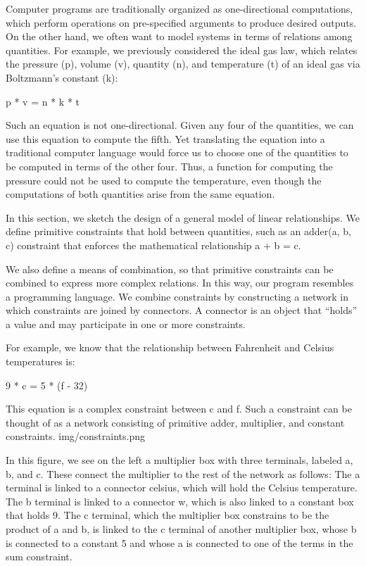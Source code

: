 \documentclass[letterpaper,10pt,dvipdfmx]{sphinxmanual}
\begin{document}
Computer programs are traditionally organized as one-directional computations, which perform operations on pre-specified arguments to produce desired outputs. On the other hand, we often want to model systems in terms of relations among quantities. For example, we previously considered the ideal gas law, which relates the pressure (p), volume (v), quantity (n), and temperature (t) of an ideal gas via Boltzmann's constant (k):

p * v = n * k * t

Such an equation is not one-directional. Given any four of the quantities, we can use this equation to compute the fifth. Yet translating the equation into a traditional computer language would force us to choose one of the quantities to be computed in terms of the other four. Thus, a function for computing the pressure could not be used to compute the temperature, even though the computations of both quantities arise from the same equation.

In this section, we sketch the design of a general model of linear relationships. We define primitive constraints that hold between quantities, such as an adder(a, b, c) constraint that enforces the mathematical relationship a + b = c.

We also define a means of combination, so that primitive constraints can be combined to express more complex relations. In this way, our program resembles a programming language. We combine constraints by constructing a network in which constraints are joined by connectors. A connector is an object that ``holds'' a value and may participate in one or more constraints.

For example, we know that the relationship between Fahrenheit and Celsius temperatures is:

9 * c = 5 * (f - 32)

This equation is a complex constraint between c and f. Such a constraint can be thought of as a network consisting of primitive adder, multiplier, and constant constraints.
img/constraints.png

In this figure, we see on the left a multiplier box with three terminals, labeled a, b, and c. These connect the multiplier to the rest of the network as follows: The a terminal is linked to a connector celsius, which will hold the Celsius temperature. The b terminal is linked to a connector w, which is also linked to a constant box that holds 9. The c terminal, which the multiplier box constrains to be the product of a and b, is linked to the c terminal of another multiplier box, whose b is connected to a constant 5 and whose a is connected to one of the terms in the sum constraint.
\end{document}
